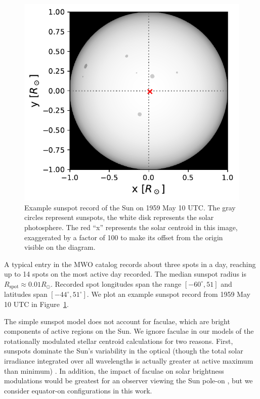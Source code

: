 \begin{figure}
\begin{center}
\includegraphics[scale=0.8]{gaia/example_sun.pdf}
\end{center}
\caption{Example sunspot record of the Sun on 1959 May 10 UTC. The gray circles represent sunspots, the white disk represents the solar photosphere. The red ``x'' represents the solar centroid in this image, exaggerated by a factor of 100 to make its offset from the origin visible on the diagram.} \label{fig:sunexample}
\end{figure}
A typical entry in the MWO catalog records about three spots in a day, reaching up to 14 spots on the most active day recorded. The median sunspot radius is $R_{\mathrm{spot}} \approx 0.01 R_\odot$. Recorded spot longitudes span the range $[-60^\circ, 51]$ and latitudes span $[-44^\circ, 51^\circ]$. We plot an example sunspot record from 1959 May 10 UTC in Figure~\ref{fig:sunexample}.

The simple sunspot model does not account for faculae, which are bright components of active regions on the Sun. We ignore faculae in our models of the rotationally modulated stellar centroid calculations for two reasons. First, sunspots dominate the Sun's variability in the optical (though the total solar irradiance integrated over all wavelengths is actually greater at active maximum than minimum) \citep{Shapiro2016}. In addition, the impact of faculae on solar brightness modulations would be greatest for an observer viewing the Sun pole-on \citep{Radick1998, Shapiro2016}, but we consider equator-on configurations in this work. 

